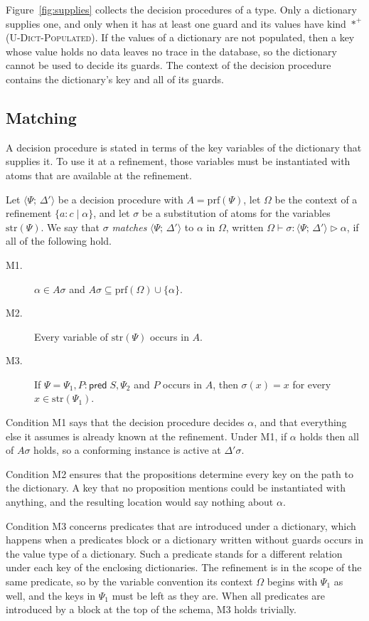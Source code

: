 \documentclass[11pt]{article}
\newcommand{\kw}[1]{\mathsf{#1}}
\newcommand{\pred}[1]{\kw{pred}\;#1}
\newcommand{\populated}{\ast^{+}}
\newcommand{\refine}[3]{\{#1 : #2 \mid #3\}}
\newcommand{\rulename}[1]{\textsc{#1}}
\newcommand{\dproc}[2]{\langle #1;\, #2 \rangle}
\newcommand{\matches}[4]{#1 \vdash #2 : #3 \rhd #4}
\theoremstyle{remark}
\begin{document}
Figure~\ref{fig:supplies} collects the decision procedures of a type. Only a dictionary supplies
one, and only when it has at least one guard and its values have kind $\populated$
(\rulename{U-Dict-Populated}). If the values of a dictionary are not populated, then a key whose
value holds no data leaves no trace in the database, so the dictionary cannot be used to decide
its guards. The context of the decision procedure contains the dictionary's key and all of its
guards.

\subsection{Matching}

A decision procedure is stated in terms of the key variables of the dictionary that supplies it.
To use it at a refinement, those variables must be instantiated with atoms that are available at
the refinement.

Let $\dproc{\Psi}{\Delta'}$ be a decision procedure with $A = \mathrm{prf}(\Psi)$, let $\Omega$ be
the context of a refinement $\refine{a}{c}{\alpha}$, and let $\sigma$ be a substitution of atoms
for the variables $\mathrm{str}(\Psi)$. We say that $\sigma$ \emph{matches} $\dproc{\Psi}{\Delta'}$
to $\alpha$ in $\Omega$, written
$\matches{\Omega}{\sigma}{\dproc{\Psi}{\Delta'}}{\alpha}$,
if all of the following hold.
\begin{description}
\item[M1.] $\alpha \in A\sigma$ and $A\sigma \subseteq \mathrm{prf}(\Omega) \cup \{\alpha\}$.
\item[M2.] Every variable of $\mathrm{str}(\Psi)$ occurs in $A$.
\item[M3.] If $\Psi = \Psi_1, P : \pred{S}, \Psi_2$ and $P$ occurs in $A$, then $\sigma(x) = x$
  for every $x \in \mathrm{str}(\Psi_1)$.
\end{description}

Condition M1 says that the decision procedure decides $\alpha$, and that everything else it
assumes is already known at the refinement. Under M1, if $\alpha$ holds then all of $A\sigma$
holds, so a conforming instance is active at $\Delta'\sigma$.

Condition M2 ensures that the propositions determine every key on the path to the dictionary. A key
that no proposition mentions could be instantiated with anything, and the resulting location would
say nothing about $\alpha$.

Condition M3 concerns predicates that are introduced under a dictionary, which happens when a
predicates block or a dictionary written without guards occurs in the value type of a dictionary. Such a
predicate stands for a different relation under each key of the enclosing dictionaries. The
refinement is in the scope of the same predicate, so by the variable convention its context
$\Omega$ begins with $\Psi_1$ as well, and the keys in $\Psi_1$ must be left as they are. When all
predicates are introduced by a block at the top of the schema, M3 holds trivially.
\end{document}
